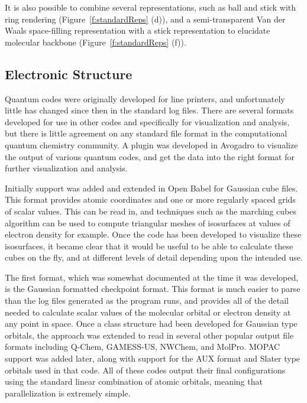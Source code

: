 \documentclass[10pt]{bmc_article}
\newenvironment{bmcformat}{\begin{raggedright}
\baselineskip20pt\sloppy\setboolean{publ}{false}}{\end{raggedright}
\baselineskip20pt\sloppy}
\begin{document}
\begin{bmcformat}
It is also possible to combine several representations, such as ball and stick
with ring rendering (Figure~\ref{f:standardReps} (d)), and a semi-transparent Van
der Waals space-filling representation with a stick representation to elucidate
molecular backbone (Figure~\ref{f:standardReps} (f)).

\subsection{Electronic Structure}

Quantum codes were originally developed for line printers, and unfortunately little has
changed since then in the standard log files. There are several formats developed for
use in other codes and specifically for visualization and analysis, but there is little
agreement on any standard file format in the computational quantum chemistry
community. A plugin was developed in Avogadro to visualize the output of various
quantum codes, and get the data into the right format for further visualization and
analysis.

Initially support was added and extended in Open Babel for Gaussian cube files.
This format provides atomic coordinates and one or more regularly spaced grids
of scalar values. This can be read in, and techniques such as the marching cubes
algorithm can be used to compute triangular meshes of isosurfaces at values of
electron density for example. Once the code has been developed to visualize these
isosurfaces, it became clear that it would be useful to be able to calculate these cubes
on the fly, and at different levels of detail depending upon the intended use.

The first format, which was somewhat documented at the time it was developed, is the
Gaussian formatted checkpoint format. This format is much easier to parse than the
log files generated as the program runs, and provides all of the detail needed to
calculate scalar values of the molecular orbital or electron density at any point in space.
Once a class structure had been developed for Gaussian type orbitals, the approach
was extended to read in several other popular output file formats including Q-Chem,
GAMESS-US, NWChem, and MolPro. MOPAC support was added later, along with
support for the AUX format and Slater type orbitals used in that code. All of these
codes output their final configurations using the standard linear combination of
atomic orbitals, meaning that parallelization is extremely simple.


\end{bmcformat}
\end{document}
